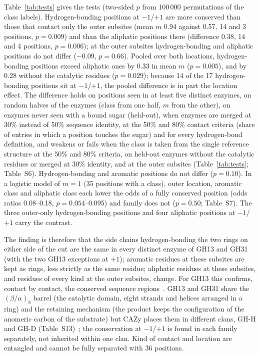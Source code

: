 \documentclass[preprint,12pt]{elsarticle}
\begin{document}
Table~\ref{tab:tests} gives the tests (two-sided $p$ from 100\,000 permutations of the class labels). Hydrogen-bonding positions at
$-1$/$+1$ are more conserved than those that contact only the outer subsites (mean $m$ 0.94 against 0.57, 14 and 3
positions, $p = 0.009$) and than the aliphatic positions there (difference 0.38, 14 and 4 positions, $p = 0.006$); at the
outer subsites hydrogen-bonding and aliphatic positions do not differ ($-0.09$, $p = 0.66$). Pooled over both locations,
hydrogen-bonding positions exceed aliphatic ones by 0.33 in mean $m$ ($p = 0.005$), and by 0.28 without the catalytic
residues ($p = 0.029$); because 14 of the 17 hydrogen-bonding positions sit at $-1$/$+1$, the pooled difference is in
part the location effect. The difference holds on positions seen in at least five distinct enzymes, on random halves of the enzymes (class from one half, $m$ from the other), on enzymes never seen with a bound sugar (held-out), when enzymes are merged at 30\% instead of 50\% sequence identity, at the 50\% and 80\% contact criteria (share of entries in which a position touches the sugar) and for every hydrogen-bond definition,
and weakens or fails when the class is taken from the single reference structure at the 50\% and 80\% criteria, on held-out
enzymes without the catalytic residues or merged at 30\% identity, and at the outer subsites (Table~\ref{tab:tests};
Table~S6). Hydrogen-bonding and aromatic positions do not differ ($p = 0.10$). In a logistic model of $m = 1$ (35
positions with a class), outer location, aromatic class and aliphatic class each lower the odds of a fully conserved
position (odds ratios 0.08--0.18, $p = 0.054$--0.095) and family does not ($p = 0.50$; Table~S7). The three outer-only
hydrogen-bonding positions and four aliphatic positions at $-1$/$+1$ carry the contrast.

The finding is therefore that the side chains hydrogen-bonding the two rings on either side of the cut are the same
in every distinct enzyme of GH13 and GH31 (with the two GH13 exceptions at $+1$); aromatic residues at these subsites
are kept as rings, less strictly as the same residue; aliphatic residues at these subsites, and residues of every
kind at the outer subsites, change. For GH13 this confirms, contact by contact, the conserved sequence
regions~\citep{MacGregor2001,Janecek2014}. GH13 and GH31 share the $(\beta/\alpha)_8$ barrel (the catalytic domain, eight strands and helices arranged in a ring) and the retaining
mechanism (the product keeps the configuration of the anomeric carbon of the substrate) but CAZy places them in different clans, GH-H and GH-D (Table~S13)~\citep{Drula2022};
the conservation at $-1$/$+1$ is found in each family separately, not inherited within one clan. Kind of contact and location are entangled and cannot be fully separated with 36 positions.
\end{document}
